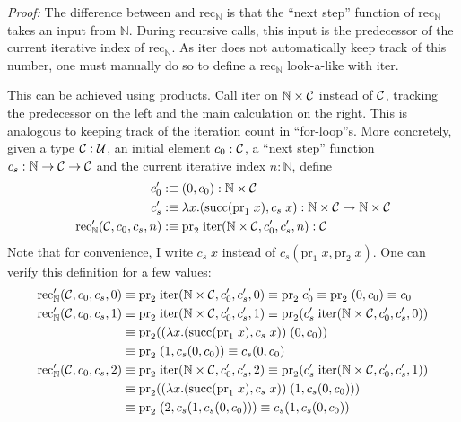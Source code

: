 \textit{Proof:} The difference between  and $\text{rec}_{\mathbb{N}}$ is that the ``next step'' function of $\text{rec}_{\mathbb{N}}$ takes an input from $\mathbb{N}$. During recursive calls, this input is the predecessor of the current iterative index of $\text{rec}_{\mathbb{N}}$. As $\text{iter}$ does not automatically keep track of this number, one must manually do so to define a $\text{rec}_{\mathbb{N}}$ look-a-like with $\text{iter}$.

This can be achieved using products. Call $\text{iter}$ on $\mathbb{N} \times \mathcal{C}$ instead of $\mathcal{C}$, tracking the predecessor on the left and the main calculation on the right. This is analogous to keeping track of the iteration count in ``for-loop''s. More concretely, given a type $\mathcal{C} : \mathcal{U}$, an initial element $c_{0} : \mathcal{C}$, a ``next step'' function $c_{s} : \mathbb{N} \to \mathcal{C} \to \mathcal{C}$ and the current iterative index $n : \mathbb{N}$, define
\begin{align*}
	c'_{0} &:\equiv (0, c_{0}) : \mathbb{N} \times \mathcal{C} \\
	c'_{s} &:\equiv \lambda x.(\text{succ}(\text{pr}_{1}\;x),c_{s}\;x) : \mathbb{N} \times \mathcal{C} \to \mathbb{N} \times \mathcal{C} \\
	\text{rec}'_{\mathbb{N}}(\mathcal{C}, c_{0}, c_{s}, n) &:\equiv \text{pr}_{2}\;\text{iter}(\mathbb{N} \times \mathcal{C}, c'_{0}, c'_{s}, n) : \mathcal{C}
\end{align*}
Note that for convenience, I write $c_{s}\;x$ instead of $c_{s}(\text{pr}_{1}\;x,\text{pr}_{2}\;x)$. One can verify this definition for a few values:
\begin{align*}
	\text{rec}'_{\mathbb{N}}(\mathcal{C}, c_{0}, c_{s}, 0) &\equiv \text{pr}_{2}\;\text{iter}(\mathbb{N} \times \mathcal{C}, c'_{0}, c'_{s}, 0) \equiv \text{pr}_{2}\;c'_{0} \equiv \text{pr}_{2}\;(0,c_{0}) \equiv c_{0} \\
	\text{rec}'_{\mathbb{N}}(\mathcal{C}, c_{0}, c_{s}, 1) &\equiv \text{pr}_{2}\;\text{iter}(\mathbb{N} \times \mathcal{C}, c'_{0}, c'_{s}, 1) \equiv \text{pr}_{2}(c'_{s}\;\text{iter}(\mathbb{N} \times \mathcal{C}, c'_{0}, c'_{s}, 0)) \\
	&\equiv \text{pr}_{2}((\lambda x.(\text{succ}(\text{pr}_{1}\;x),c_{s}\;x))\;(0,c_{0})) \\
	&\equiv \text{pr}_{2}\;(1,c_{s}(0,c_{0})) \equiv c_{s}(0,c_{0}) \\
	\text{rec}'_{\mathbb{N}}(\mathcal{C}, c_{0}, c_{s}, 2) &\equiv \text{pr}_{2}\;\text{iter}(\mathbb{N} \times \mathcal{C}, c'_{0}, c'_{s}, 2) \equiv \text{pr}_{2}(c'_{s}\;\text{iter}(\mathbb{N} \times \mathcal{C}, c'_{0}, c'_{s}, 1)) \\
	&\equiv \text{pr}_{2}((\lambda x.(\text{succ}(\text{pr}_{1}\;x),c_{s}\;x))\;(1,c_{s}(0,c_{0}))) \\
	&\equiv \text{pr}_{2}\;(2,c_{s}(1,c_{s}(0,c_{0}))) \equiv c_{s}(1,c_{s}(0,c_{0}))
\end{align*}
